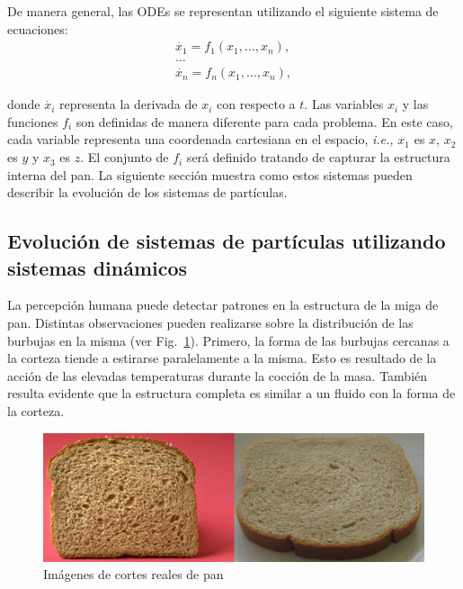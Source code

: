 \documentclass[oneside,a4paper,spanish,links]{amca}
\begin{document}
De manera general, las ODEs se representan utilizando el siguiente sistema de ecuaciones:
\begin{equation} \label{eq:simple}  
  \begin{aligned}
    \dot{x_{1}} = f_{1}(x_{1},\ldots,x_{n}),\\
    \ldots\\
    \dot{x_{n}} = f_{n}(x_{1},\ldots,x_{n}),
  \end{aligned}
\end{equation}

\noindent donde $\dot{x_{i}}$ representa la derivada de $x_{i}$ con respecto
a $t$. Las variables $x_{i}$ y las funciones $f_{i}$ son definidas de manera diferente para cada problema. En este caso, cada variable representa una coordenada cartesiana en el espacio, {\em i.e.,} $x_{1}$ es $x$, $x_{2}$ es $y$ y $x_{3}$ es $z$. El conjunto de $f_{i}$ ser\'a definido tratando de capturar la estructura interna del pan. La siguiente secci\'on muestra como estos sistemas pueden describir la evoluci\'on de los sistemas de part\'iculas.

\subsection{Evoluci\'on de sistemas de part\'iculas utilizando sistemas din\'amicos}

La percepci\'on humana puede detectar patrones en la estructura de la miga de pan. Distintas observaciones pueden realizarse sobre la distribuci\'on de las burbujas en la misma (ver Fig.~\ref{fg:fig2}). Primero, la forma de las burbujas cercanas a la corteza tiende a estirarse paralelamente a la misma. Esto es resultado de la acci\'on de las elevadas temperaturas durante la cocci\'on de la masa. Tambi\'en resulta evidente que la estructura completa es similar a un fluido con la forma de la corteza.


\begin{figure}[htb!]
  \centerline{\includegraphics[scale=0.45]{fig2}}
  \caption{Im\'agenes de cortes reales de pan}
  \label{fg:fig2}
\end{figure}
\end{document}
